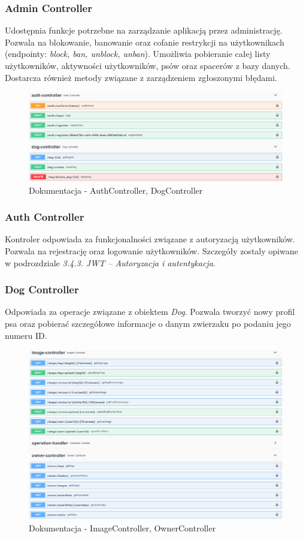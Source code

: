 \subsubsection{Admin Controller}
Udostępnia funkcje potrzebne na zarządzanie aplikacją przez administrację. Pozwala na blokowanie, banowanie oraz cofanie restrykcji na użytkownikach (endpointy: \textit{block, ban, unblock, unban}). Umożliwia pobieranie całej listy użytkowników, aktywności użytkowników, psów oraz spacerów z bazy danych. Dostarcza również metody związane z zarządzeniem zgłoszonymi błędami.

\begin{figure}[H]
    \centering
    \includegraphics[width=1\linewidth]{rysunki/sw-2.PNG}
    \caption{Dokumentacja - AuthController, DogController}
    \label{fig:swagger-2}
\end{figure}
\subsubsection{Auth Controller}
Kontroler odpowiada za funkcjonalności związane z autoryzacją użytkowników. Pozwala na rejestrację oraz logowanie użytkowników. Szczegóły zostaly opiwane w podrozdziale \textit{3.4.3. JWT – Autoryzacja i autentykacja}. 

\subsubsection{Dog Controller}
Odpowiada za operacje związane z obiektem \textit{Dog}. Pozwala tworzyć nowy profil psa oraz pobierać szczegółowe informacje o danym zwierzaku po podaniu jego numeru ID.

\begin{figure}[H]
    \centering
    \includegraphics[width=1\linewidth]{rysunki/sw-3.PNG}
    \caption{Dokumentacja - ImageController, OwnerController}
    \label{fig:swagger-3}
\end{figure}
